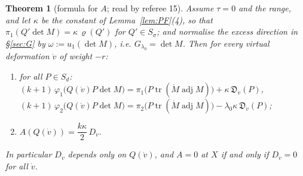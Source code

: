 \documentclass[11pt]{article}
\numberwithin{equation}{section}
\newtheorem{theorem}{Theorem}[section]
\theoremstyle{remark}
\newcommand{\lz}{\lambda_0}
\begin{document}
\begin{theorem}[formula for $A$; read by referee 15]\label{thm:FA}
Assume $\tau=0$ and the range, and let $\kappa$ be the constant of Lemma~\ref{lem:PF}\textup{(4)}, so
that $\pi_1(Q'\det M)=\kappa\,\varrho(Q')$ for $Q'\in S_\sigma$; and
normalise the excess direction in \S\ref{sec:G} by $\omega:=u_1(\det M)$, i.e. $G_{\lz}=\det M$. Then for every
virtual deformation $\dot v$ of weight $-r$:
\begin{enumerate}
\item for all $P\in S_d$:\quad
$(k+1)\,\varphi_1\bigl(Q(\dot v)P\det M\bigr)=\pi_1\bigl(P\operatorname{tr}(\dot M\operatorname{adj}M)\bigr)+\kappa\,\mathfrak D_{\dot v}(P)$,\\
\phantom{for all $P\in S_d$:\quad}
$(k+1)\,\varphi_2\bigl(Q(\dot v)P\det M\bigr)=\pi_2\bigl(P\operatorname{tr}(\dot M\operatorname{adj}M)\bigr)-\lz\kappa\,\mathfrak D_{\dot v}(P)$;
\item $A(Q(\dot v))=\dfrac{k\kappa}{2}\,D_{\dot v}$.
\end{enumerate}
In particular $D_{\dot v}$ depends only on $Q(\dot v)$, and $A=0$ at $X$ if and only if $D_{\dot v}=0$ for all $\dot v$.
\end{theorem}
\end{document}
